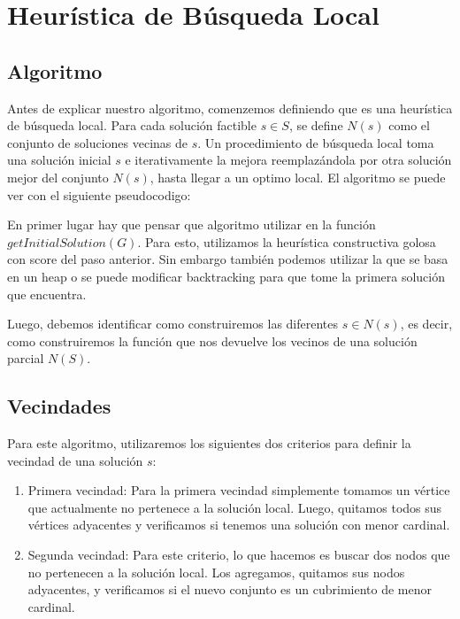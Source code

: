 \section{Heurística de Búsqueda Local}

\subsection{Algoritmo}

Antes de explicar nuestro algoritmo, comenzemos definiendo que es una heurística de búsqueda local. Para cada solución factible $s \in S$, se define $N(s)$ como el conjunto de soluciones vecinas de $s$. Un procedimiento de búsqueda local toma una solución inicial $s$ e iterativamente la mejora reemplazándola por otra solución mejor del conjunto $N(s)$, hasta llegar a un optimo local. El algoritmo se puede ver con el siguiente pseudocodigo:

\begin{algorithmic}
		\EndIf
	\EndFor
\EndWhile
\EndProcedure
\end{algorithmic}

\hspace{1px}

En primer lugar hay que pensar que algoritmo utilizar en la función $getInitialSolution(G)$. Para esto, utilizamos la heurística constructiva golosa con score del paso anterior. Sin embargo también podemos utilizar la que se basa en un heap o se puede modificar backtracking para que tome la primera solución que encuentra.

Luego, debemos identificar como construiremos las diferentes $s \in N(s)$, es decir, como construiremos la función que nos devuelve los vecinos de una solución parcial $N(S)$.

\subsection{Vecindades}

Para este algoritmo, utilizaremos los siguientes dos criterios para definir la vecindad de una solución $s$:

\begin{enumerate}
\item Primera vecindad:
Para la primera vecindad simplemente tomamos un vértice que actualmente no pertenece a la solución local. Luego, quitamos todos sus vértices adyacentes y verificamos si tenemos una solución con menor cardinal.
\item Segunda vecindad:
Para este criterio, lo que hacemos es buscar dos nodos que no pertenecen a la solución local. Los agregamos, quitamos sus nodos adyacentes, y verificamos si el nuevo conjunto es un cubrimiento de menor cardinal.
\end{enumerate}

